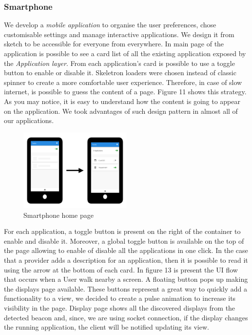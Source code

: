 \documentclass[]{usiinfbachelorproject}
\begin{document}
\subsubsection{Smartphone}
We develop a \emph{mobile application} to organise the user preferences, chose customisable settings and manage interactive applications. We design it from sketch to be accessible for everyone from everywhere. In main page of the application is possible to see a card list of all the existing application exposed by the \emph{Application layer}. From each application's card is possible to use a toggle button to enable or disable it. Skeletron loaders were chosen instead of classic spinner to create a more comfortable user experience. Therefore, in case of slow internet, is possible to guess the content of a page. Figure 11 shows this strategy. As you may notice, it is easy to understand how the content is going to appear on the application. We took advantages of such design pattern in almost all of our applications.
\begin{figure}[H]
\centering
\includegraphics[width=0.5\textwidth]{./images/smartphone_loading_applications}
\caption{Smartphone home page}
\end{figure}
For each application, a toggle button is present on the right of the container to enable and disable it. Moreover, a global toggle button is available on the top of the page allowing to enable of disable all the applications in one click. In the case that a provider adds a description for an application, then it is possible to read it using the arrow at the bottom of each card.
In figure 13 is present the UI flow that occurs when a User walk nearby a screen. A floating button pops up making the displays page available. These buttons represent a great way to quickly add a functionality to a view, we decided to create a pulse animation to increase its visibility in the page. Display page shows all the discovered displays from the detected beacon and, since, we are using socket connection, if the display changes the running application, the client will be notified updating its view.
\end{document}
